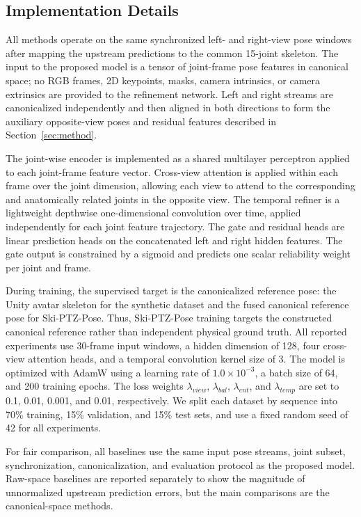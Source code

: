 \documentclass[sigconf,screen]{acmart}
\begin{document}
\subsection{Implementation Details}
\label{subsec:implementation_details}

All methods operate on the same synchronized left- and right-view pose windows after mapping the upstream predictions to the common 15-joint skeleton. The input to the proposed model is a tensor of joint-frame pose features in canonical space; no RGB frames, 2D keypoints, masks, camera intrinsics, or camera extrinsics are provided to the refinement network. Left and right streams are canonicalized independently and then aligned in both directions to form the auxiliary opposite-view poses and residual features described in Section~\ref{sec:method}.

The joint-wise encoder is implemented as a shared multilayer perceptron applied to each joint-frame feature vector. Cross-view attention is applied within each frame over the joint dimension, allowing each view to attend to the corresponding and anatomically related joints in the opposite view. The temporal refiner is a lightweight depthwise one-dimensional convolution over time, applied independently for each joint feature trajectory. The gate and residual heads are linear prediction heads on the concatenated left and right hidden features. The gate output is constrained by a sigmoid and predicts one scalar reliability weight per joint and frame.

During training, the supervised target is the canonicalized reference pose: the Unity avatar skeleton for the synthetic dataset and the fused canonical reference pose for Ski-PTZ-Pose. Thus, Ski-PTZ-Pose training targets the constructed canonical reference rather than independent physical ground truth. All reported experiments use 30-frame input windows, a hidden dimension of 128, four cross-view attention heads, and a temporal convolution kernel size of 3. The model is optimized with AdamW using a learning rate of \(1.0 \times 10^{-3}\), a batch size of 64, and 200 training epochs. The loss weights \(\lambda_{view}\), \(\lambda_{bal}\), \(\lambda_{ent}\), and \(\lambda_{temp}\) are set to 0.1, 0.01, 0.001, and 0.01, respectively. We split each dataset by sequence into 70\% training, 15\% validation, and 15\% test sets, and use a fixed random seed of 42 for all experiments.

For fair comparison, all baselines use the same input pose streams, joint subset, synchronization, canonicalization, and evaluation protocol as the proposed model. Raw-space baselines are reported separately to show the magnitude of unnormalized upstream prediction errors, but the main comparisons are the canonical-space methods.
\end{document}
